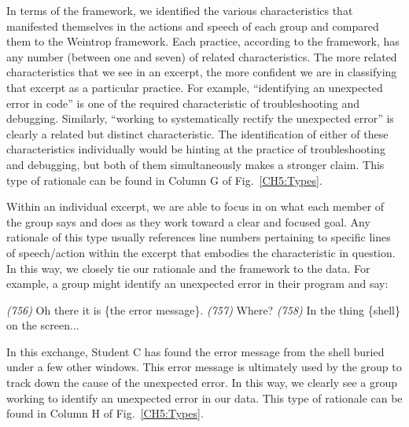 \documentclass{msuphddissertation}
\begin{document}
\begin{doublespace}
In terms of the framework, we identified the various characteristics that manifested themselves in the actions and speech of each group and compared them to the Weintrop framework.  Each practice, according to the framework, has any number (between one and seven) of related characteristics.  The more related characteristics that we see in an excerpt, the more confident we are in classifying that excerpt as a particular practice.  For example, ``identifying an unexpected error in code'' is one of the required characteristic of troubleshooting and debugging.  Similarly, ``working to systematically rectify the unexpected error'' is clearly a related but distinct characteristic.  The identification of either of these characteristics individually would be hinting at the practice of troubleshooting and debugging, but both of them simultaneously makes a stronger claim.  This type of rationale can be found in Column G of Fig.~\ref{CH5:Types}.

Within an individual excerpt, we are able to focus in on what each member of the group says and does as they work toward a clear and focused goal.  Any rationale of this type usually references line numbers pertaining to specific lines of speech/action within the excerpt that embodies the characteristic in question.  In this way, we closely tie our rationale and the framework to the data.  For example, a group might identify an unexpected error in their program and say: \begin{description}
\SC \textit{(756)} Oh there it is \{the error message\}.
\SB \textit{(757)} Where?
\SC \textit{(758)} In the thing \{shell\} on the screen...
\end{description}  In this exchange, Student C has found the error message from the shell buried under a few other windows.  This error message is ultimately used by the group to track down the cause of the unexpected error.  In this way, we clearly see a group working to identify an unexpected error in our data.  This type of rationale can be found in Column H of Fig.~\ref{CH5:Types}.


\end{doublespace}
\end{document}
